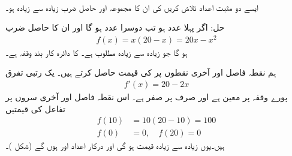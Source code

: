 
\\
ایسے دو مثبت اعداد تلاش کریں کی ان کا مجموعہ  اور  حاصل ضرب زیادہ سے زیادہ ہو۔

حل:\quad
اگر پہلا عدد  ہو تب دوسرا عدد  ہو گا اور ان کا حاصل ضرب
\begin{align*}
f(x)=x(20-x)=20x-x^2
\end{align*}
ہو گا جو زیادہ سے زیادہ مطلوب ہے۔  کا دائرہ کار بند وقفہ  ہے۔

ہم نقطہ فاصل اور آخری نقطوں پر  کی قیمت حاصل کرتے ہیں۔ یک رتبی تفرق
\begin{align*}
f'(x)=20-2x
\end{align*}
پورے وقفہ  پر معین ہے اور صرف  پر صفر ہے۔ اس نقطہ فاصل اور آخری سروں پر تفاعل کی قیمتیں
\begin{align*}
f(10)&=10(20-10)=100\\
f(0)&=0,\quad f(20)=0
\end{align*}
ہیں۔یوں  زیادہ سے زیادہ قیمت ہو گی اور درکار اعداد  اور  ہوں گے (شکل )۔
